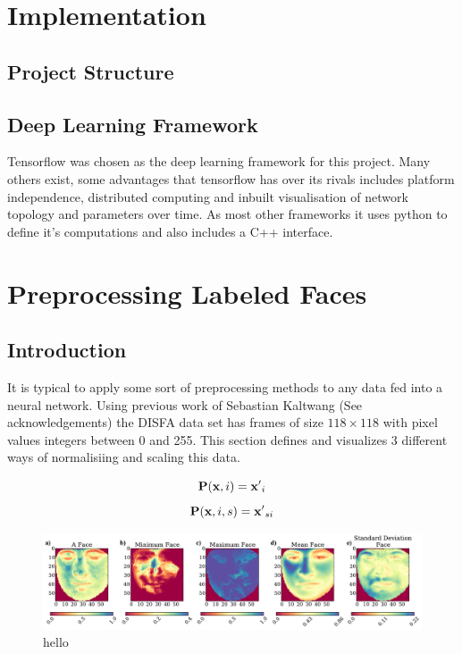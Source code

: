 \documentclass[11pt,twoside]{report}
\begin{document}
\chapter{Implementation}
\section{Project Structure}
\section{Deep Learning Framework}
Tensorflow \cite{tensorflow} was chosen as the deep learning framework for this
project. Many others exist, some advantages that tensorflow has over its rivals
includes platform independence, distributed computing and inbuilt visualisation
of network topology and parameters over time. As most other frameworks it uses python
to define it's computations and also includes a C++ interface.


\chapter{Preprocessing Labeled Faces}
\section{Introduction}
It is typical to apply some sort of preprocessing methods to any data fed into
a neural network. Using previous work of Sebastian Kaltwang (See acknowledgements) the
DISFA data set has frames of size $118 \times 118$ with pixel values integers between
0 and 255. This section defines and visualizes 3 different ways of normalisiing and scaling
this data.



\begin{equation}
  {\bf P}({\bf x},i) = {\bf x'}_i
\end{equation}
\begin{equation}
  {\bf P}({\bf x},i,s) = {\bf x'}_{si}
\end{equation}
\begin{figure}[!h]
\centering
\includegraphics[width =\hsize]{figures/faces.pdf}
\caption{hello}
\label{fig:simple}
\end{figure}
\end{document}
